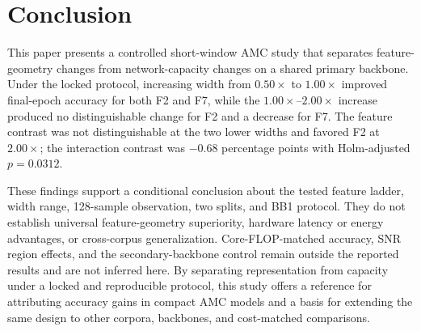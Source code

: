 \section{Conclusion}\color{black}
This paper presents a controlled short-window AMC study that separates
feature-geometry changes from network-capacity changes on a shared primary
backbone. Under the locked protocol, increasing width from $0.50\times$ to
$1.00\times$ improved final-epoch accuracy for both F2 and F7, while the
$1.00\times$--$2.00\times$ increase produced no distinguishable change for F2
and a decrease for F7. The feature contrast was not distinguishable at the two
lower widths and favored F2 at $2.00\times$; the interaction contrast was
$-0.68$ percentage points with Holm-adjusted $p=0.0312$.

These findings support a conditional conclusion about the tested feature ladder,
width range, 128-sample observation, two splits, and BB1 protocol. They do not
establish universal feature-geometry superiority, hardware latency or energy
advantages, or cross-corpus generalization. Core-FLOP-matched accuracy, SNR
region effects, and the secondary-backbone control remain outside the reported
results and are not inferred here. By separating representation from capacity
under a locked and reproducible protocol, this study offers a reference for
attributing accuracy gains in compact AMC models and a basis for extending the
same design to other corpora, backbones, and cost-matched comparisons.
